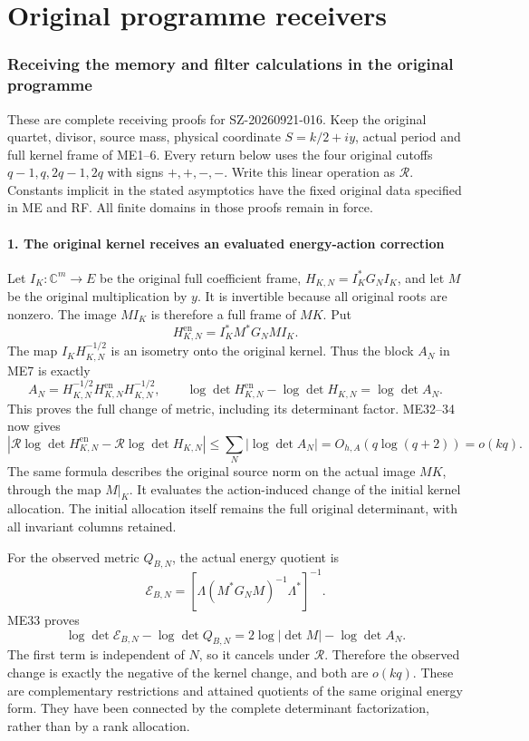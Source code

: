 \documentclass[11pt]{article}
\begin{document}
\clearpage\part{Original programme receivers}
\section{Receiving the memory and filter calculations in the original programme}\label{receiving-the-memory-and-filter-calculations-in-the-original-programme}

These are complete receiving proofs for SZ-20260921-016. Keep the original quartet, divisor, source mass, physical coordinate \(S=k/2+iy\), actual period and full kernel frame of ME1--6. Every return below uses the four original cutoffs \(q-1,q,2q-1,2q\) with signs \(+,+,-,-\). Write this linear operation as \(\mathcal R\). Constants implicit in the stated asymptotics have the fixed original data specified in ME and RF. All finite domains in those proofs remain in force.

\subsection{1. The original kernel receives an evaluated energy-action correction}\label{the-original-kernel-receives-an-evaluated-energy-action-correction}

Let \(I_K:\mathbb C^m\to E\) be the original full coefficient frame, \(H_{K,N}=I_K^*G_NI_K\), and let \(M\) be the original multiplication by \(y\). It is invertible because all original roots are nonzero. The image \(MI_K\) is therefore a full frame of \(MK\). Put \[
H^{\mathrm{en}}_{K,N}=I_K^*M^*G_NMI_K.
\tag{BR1}
\] The map \(I_KH_{K,N}^{-1/2}\) is an isometry onto the original kernel. Thus the block \(A_N\) in ME7 is exactly \[
A_N=H_{K,N}^{-1/2}H^{\mathrm{en}}_{K,N}H_{K,N}^{-1/2},\qquad
\log\det H^{\mathrm{en}}_{K,N}-\log\det H_{K,N}=\log\det A_N.
\tag{BR2}
\] This proves the full change of metric, including its determinant factor. ME32--34 now gives \[
\left|\mathcal R\log\det H^{\mathrm{en}}_{K,N}
-\mathcal R\log\det H_{K,N}\right|
\le\sum_N|\log\det A_N|
=O_{h,A}(q\log(q+2))=o(kq).
\tag{BR3}
\] The same formula describes the original source norm on the actual image \(MK\), through the map \(M|_K\). It evaluates the action-induced change of the initial kernel allocation. The initial allocation itself remains the full original determinant, with all invariant columns retained.

For the observed metric \(Q_{B,N}\), the actual energy quotient is \[
\mathcal E_{B,N}
=[\Lambda(M^*G_NM)^{-1}\Lambda^*]^{-1}.
\tag{BR4}
\] ME33 proves \[
\log\det\mathcal E_{B,N}-\log\det Q_{B,N}
=2\log|\det M|-\log\det A_N.
\tag{BR5}
\] The first term is independent of \(N\), so it cancels under \(\mathcal R\). Therefore the observed change is exactly the negative of the kernel change, and both are \(o(kq)\). These are complementary restrictions and attained quotients of the same original energy form. They have been connected by the complete determinant factorization, rather than by a rank allocation.
\end{document}
